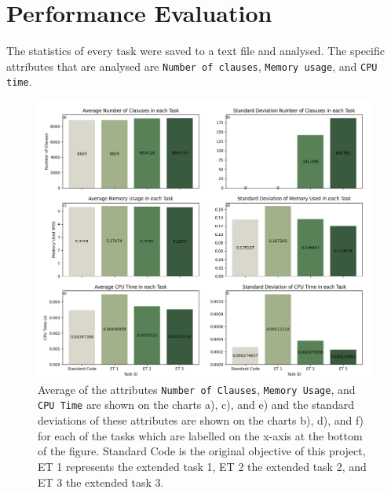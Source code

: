 \documentclass[12pt]{article}
\begin{document}
\section{Performance Evaluation}

The statistics of every task were saved to a text file and analysed. The specific attributes that are analysed are \texttt{Number of clauses}, \texttt{Memory usage}, and \texttt{CPU time}.

\begin{figure}[hbt!]
	\centering
	\includegraphics[scale=0.5]{average_std}
	\caption{Average of the attributes \texttt{Number of Clauses}, \texttt{Memory Usage}, and \texttt{CPU Time} are shown on the charts a), c), and e) and the standard deviations of these attributes are shown on the charts b), d), and f) for each of the tasks which are labelled on the x-axis at the bottom of the figure. Standard Code is the original objective of this project, ET 1 represents the extended task 1, ET 2 the extended task 2, and ET 3 the extended task 3. }
\end{figure}
\end{document}
